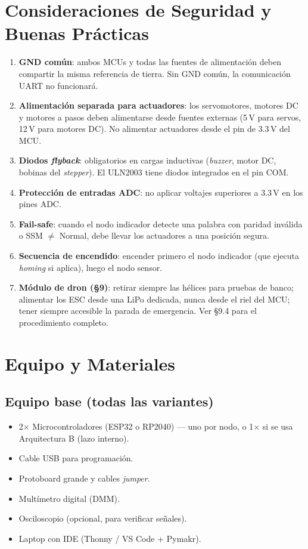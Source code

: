 \documentclass[11pt]{article}
\begin{document}
\section{Consideraciones de Seguridad y Buenas Prácticas}
\begin{enumerate}
  \item \textbf{GND común}: ambos MCUs y todas las fuentes de alimentación deben
        compartir la misma referencia de tierra. Sin GND común, la comunicación UART no
        funcionará.
  \item \textbf{Alimentación separada para actuadores}: los servomotores, motores DC y
        motores a pasos deben alimentarse desde fuentes externas (5\,V para servos,
        12\,V para motores DC). No alimentar actuadores desde el pin de 3.3\,V del MCU.
  \item \textbf{Diodos \emph{flyback}}: obligatorios en cargas inductivas (\emph{buzzer},
        motor DC, bobinas del \emph{stepper}). El ULN2003 tiene diodos integrados en el
        pin COM.
  \item \textbf{Protección de entradas ADC}: no aplicar voltajes superiores a 3.3\,V en
        los pines ADC.
  \item \textbf{Fail-safe}: cuando el nodo indicador detecte una palabra con paridad
        inválida o SSM $\ne$ Normal, debe llevar los actuadores a una posición segura.
  \item \textbf{Secuencia de encendido}: encender primero el nodo indicador (que ejecuta
        \emph{homing} si aplica), luego el nodo sensor.
  \item \textbf{Módulo de dron (\S9)}: retirar siempre las hélices para pruebas de banco;
        alimentar los ESC desde una LiPo dedicada, nunca desde el riel del MCU; tener
        siempre accesible la parada de emergencia. Ver \S9.4 para el procedimiento
        completo.
\end{enumerate}

\section{Equipo y Materiales}
\subsection{Equipo base (todas las variantes)}
\begin{itemize}
  \item 2$\times$ Microcontroladores (ESP32 o RP2040) — uno por nodo, o 1$\times$ si se
        usa Arquitectura B (lazo interno).
  \item Cable USB para programación.
  \item Protoboard grande y cables \emph{jumper}.
  \item Multímetro digital (DMM).
  \item Osciloscopio (opcional, para verificar señales).
  \item Laptop con IDE (Thonny / VS Code + Pymakr).
\end{itemize}
\end{document}
